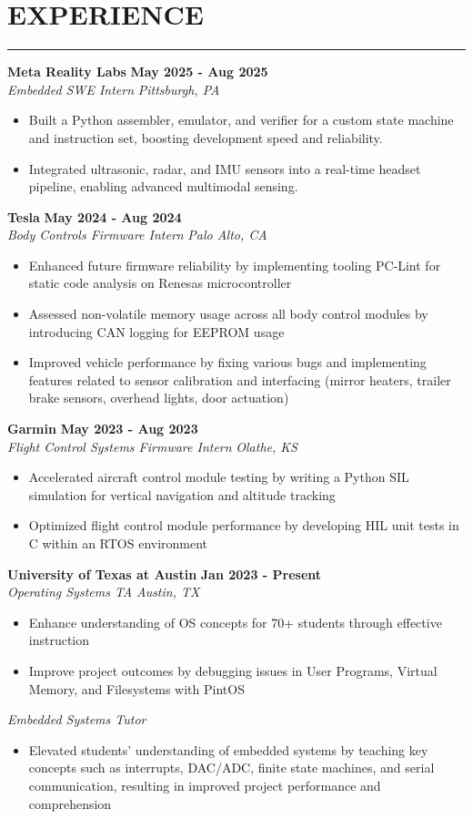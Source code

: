 \documentclass[10pt]{article}
\newcommand{\sectionHeader}[1]{%
    \vspace{-1.25\baselineskip}
    \section*{\large \MakeUppercase{#1}}
    \vspace{-1.5\baselineskip}
    \color{teal}
    \rule{\textwidth}{1.5pt} %
    \color{black}
    \vspace{-1.25\baselineskip}
    \pdfbookmark[1]{#1}{#1}
}
\newcommand{\role}[3]{
    \textit{#1} \hfill \textit{#2} \\[0pt]
    #3
}
\newcommand{\sectionItem}[5]{ %
    \textbf{#1} \hfill \textbf{#2} \\[0pt]
    \role{#3}{#4}{#5}    %
}
\begin{document}
\sectionHeader{Experience}
\begin{flushleft}
    \sectionItem{Meta Reality Labs}{May 2025 - Aug 2025}{Embedded SWE Intern}{Pittsburgh, PA}{
        \begin{itemize}
	    \item Built a Python assembler, emulator, and verifier for a custom state machine and instruction set, boosting development speed and reliability.
	    \item Integrated ultrasonic, radar, and IMU sensors into a real-time headset pipeline, enabling advanced multimodal sensing.
        \end{itemize}
    }
    
    \sectionItem{Tesla}{May 2024 - Aug 2024}{Body Controls Firmware Intern}{Palo Alto, CA}{
        \begin{itemize}
            \item Enhanced future firmware reliability by implementing tooling PC-Lint for static code analysis on Renesas microcontroller
            \item Assessed non-volatile memory usage across all body control modules by introducing CAN logging for EEPROM usage
            \item Improved vehicle performance by fixing various bugs and implementing features related to sensor calibration and interfacing (mirror heaters, trailer brake sensors, overhead lights, door actuation)     
        \end{itemize}
    }
    
    \sectionItem{Garmin}{May 2023 - Aug 2023}{Flight Control Systems Firmware Intern}{Olathe, KS}{
        \begin{itemize}
            \item Accelerated aircraft control module testing by writing a Python SIL simulation for vertical navigation and altitude tracking
            \item Optimized flight control module performance by developing HIL unit tests in C within an RTOS environment
        \end{itemize}
    }

    \sectionItem{University of Texas at Austin}{Jan 2023 - Present}{Operating Systems TA}{Austin, TX}{
        \begin{itemize}
            \item Enhance understanding of OS concepts for 70+ students through effective instruction
            \item Improve project outcomes by debugging issues in User Programs, Virtual Memory, and Filesystems with PintOS
        \end{itemize}
        \role{Embedded Systems Tutor}{}{
            \begin{itemize}
                \item Elevated students' understanding of embedded systems by teaching key concepts such as interrupts, DAC/ADC, finite state machines, and serial communication, resulting in improved project performance and comprehension
            \end{itemize}
        }
    }

\end{flushleft}
\end{document}
